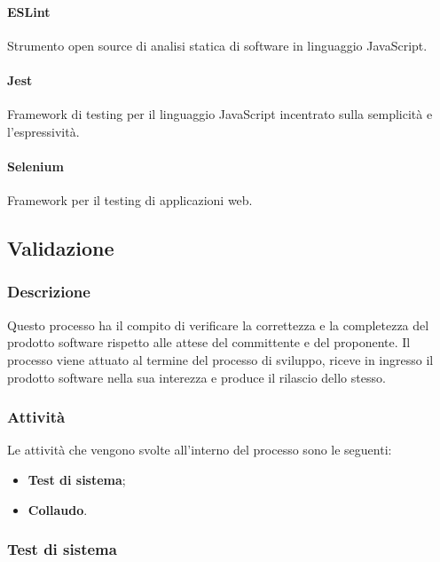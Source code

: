 \paragraph{ESLint}
\label{par:verifica:ESLint}

Strumento open source di analisi statica di software in linguaggio JavaScript.

\paragraph{Jest}
\label{par:verifica:jest}

Framework di testing per il linguaggio JavaScript incentrato sulla semplicità e l'espressività.

\paragraph{Selenium}
\label{par:verifica:selenium}

Framework per il testing di applicazioni web.

\subsection{Validazione}

\subsubsection{Descrizione}
\label{ssub:descrizione}

Questo processo ha il compito di verificare la correttezza e la completezza del prodotto software rispetto alle attese del committente e 
del proponente. Il processo viene attuato al termine del processo di sviluppo, riceve in ingresso il prodotto software nella sua interezza 
e produce il rilascio dello stesso.

\subsubsection{Attività}
\label{ssub:validazione:attivita}

Le attività che vengono svolte all'interno del processo sono le seguenti:
\begin{itemize}
	\item \textbf{Test di sistema};
	\item \textbf{Collaudo}.
\end{itemize}

\subsubsection{Test di sistema}
\label{ssub:validazione:test_sistema}

